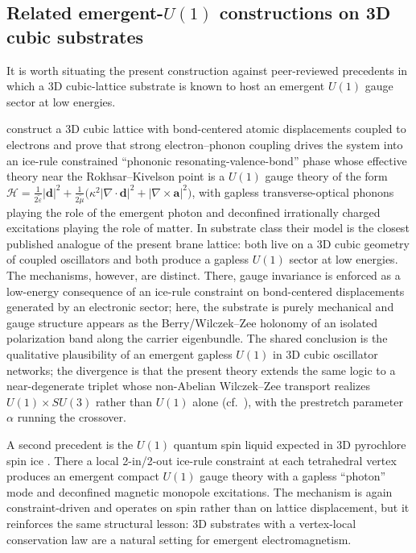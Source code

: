\subsection{Related emergent-$U(1)$ constructions on 3D cubic substrates}
\label{subsec:discussion-related-emergentEM}

It is worth situating the present construction against peer-reviewed precedents in which a 3D cubic-lattice
substrate is known to host an emergent $U(1)$ gauge sector at low energies.

\citet{HanKivelson2024EmergentGauge} construct a 3D cubic lattice with bond-centered atomic displacements
coupled to electrons and prove that strong electron--phonon coupling drives the system into an ice-rule
constrained ``phononic resonating-valence-bond'' phase whose effective theory near the Rokhsar--Kivelson point
is a $U(1)$ gauge theory of the form
$\mathcal{H}=\tfrac{1}{2\tilde\varepsilon}|\bm{d}|^2
+\tfrac{1}{2\tilde\mu}\big(\kappa^2|\nabla\!\cdot\!\bm{d}|^2+|\nabla\!\times\!\bm{a}|^2\big)$,
with gapless transverse-optical phonons playing the role of the emergent photon and deconfined irrationally
charged excitations playing the role of matter.
In substrate class their model is the closest published analogue of the present brane lattice: both live on a
3D cubic geometry of coupled oscillators and both produce a gapless $U(1)$ sector at low energies.
The mechanisms, however, are distinct.
There, gauge invariance is enforced as a low-energy consequence of an ice-rule constraint on bond-centered
displacements generated by an electronic sector; here, the substrate is purely mechanical and gauge structure
appears as the Berry/Wilczek--Zee holonomy of an isolated polarization band along the carrier eigenbundle.
The shared conclusion is the qualitative plausibility of an emergent gapless $U(1)$ in 3D cubic oscillator
networks; the divergence is that the present theory extends the same logic to a near-degenerate triplet whose
non-Abelian Wilczek--Zee transport realizes $U(1)\times SU(3)$ rather than $U(1)$ alone
(cf.\ ), with the prestretch parameter $\alpha$ running the crossover.

A second precedent is the $U(1)$ quantum spin liquid expected in 3D pyrochlore spin ice
\citep{GingrasMcClarty2014QSI}.
There a local 2-in/2-out ice-rule constraint at each tetrahedral vertex produces an emergent compact $U(1)$
gauge theory with a gapless ``photon'' mode and deconfined magnetic monopole excitations.
The mechanism is again constraint-driven and operates on spin rather than on lattice displacement, but it
reinforces the same structural lesson: 3D substrates with a vertex-local conservation law are a natural setting
for emergent electromagnetism.

